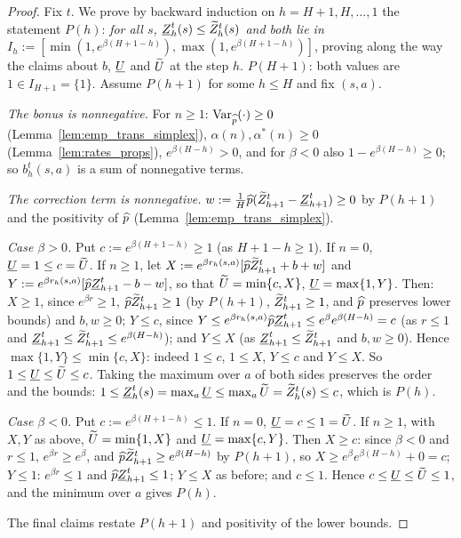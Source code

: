 \begin{proof}
\leanok
Fix $t$. We prove by backward induction on $h = H + 1, H, \dots, 1$ the statement $P(h)$:
\emph{for all $s$, $\underline{Z}^t_h(s) \le \widetilde{Z}^t_h(s)$ and both lie in $I_h := [\min(1, e^{\beta(H + 1 - h)}), \max(1, e^{\beta(H + 1 - h)})]$},
proving along the way the claims about $b$, $\underline{U}$ and $\widetilde{U}$ at the step $h$. $P(H + 1)$: both
values are $1 \in I_{H+1} = \{1\}$. Assume $P(h + 1)$ for some $h \le H$ and fix $(s, a)$.

\emph{The bonus is nonnegative.} For $n \ge 1$: $\operatorname{Var}_{\widehat{p}}(\cdot) \ge 0$ (Lemma~\ref{lem:emp_trans_simplex}),
$\alpha(n), \alpha^*(n) \ge 0$ (Lemma~\ref{lem:rates_props}), $e^{\beta(H - h)} > 0$, and for $\beta < 0$
also $1 - e^{\beta(H - h)} \ge 0$; so $b_h^t(s, a)$ is a sum of nonnegative terms.

\emph{The correction term is nonnegative.} $w := \frac1H \widehat{p}(\widetilde{Z}^t_{h+1} - \underline{Z}^t_{h+1}) \ge 0$ by
$P(h + 1)$ and the positivity of $\widehat{p}$ (Lemma~\ref{lem:emp_trans_simplex}).

\emph{Case $\beta > 0$.} Put $c := e^{\beta(H + 1 - h)} \ge 1$ (as $H + 1 - h \ge 1$). If $n = 0$,
$\underline{U} = 1 \le c = \widetilde{U}$. If $n \ge 1$, let $X := e^{\beta r_h(s, a)}[\widehat{p}\widetilde{Z}^t_{h+1} + b + w]$ and
$Y := e^{\beta r_h(s, a)}[\widehat{p}\underline{Z}^t_{h+1} - b - w]$, so that $\widetilde{U} = \min\{c, X\}$, $\underline{U} = \max\{1, Y\}$.
Then: $X \ge 1$, since $e^{\beta r} \ge 1$, $\widehat{p} \widetilde{Z}^t_{h+1} \ge 1$ (by $P(h + 1)$, $\widetilde{Z}^t_{h+1} \ge 1$,
and $\widehat{p}$ preserves lower bounds) and $b, w \ge 0$; $Y \le c$, since
$Y \le e^{\beta r_h(s, a)} \widehat{p} \underline{Z}^t_{h+1} \le e^{\beta} e^{\beta(H - h)} = c$ (as $r \le 1$ and
$\underline{Z}^t_{h+1} \le \widetilde{Z}^t_{h+1} \le e^{\beta(H - h)}$); and $Y \le X$ (as $\underline{Z}^t_{h+1} \le \widetilde{Z}^t_{h+1}$ and
$b, w \ge 0$). Hence $\max\{1, Y\} \le \min\{c, X\}$: indeed $1 \le c$, $1 \le X$, $Y \le c$ and
$Y \le X$. So $1 \le \underline{U} \le \widetilde{U} \le c$. Taking the maximum over $a$ of both sides preserves
the order and the bounds: $1 \le \underline{Z}^t_h(s) = \max_a \underline{U} \le \max_a \widetilde{U} = \widetilde{Z}^t_h(s) \le c$, which is $P(h)$.

\emph{Case $\beta < 0$.} Put $c := e^{\beta(H + 1 - h)} \le 1$. If $n = 0$, $\underline{U} = c \le 1 = \widetilde{U}$. If
$n \ge 1$, with $X, Y$ as above, $\widetilde{U} = \min\{1, X\}$ and $\underline{U} = \max\{c, Y\}$. Then $X \ge c$: since
$\beta < 0$ and $r \le 1$, $e^{\beta r} \ge e^{\beta}$, and $\widehat{p}\widetilde{Z}^t_{h+1} \ge e^{\beta(H - h)}$ by
$P(h + 1)$, so $X \ge e^{\beta} e^{\beta(H - h)} + 0 = c$; $Y \le 1$: $e^{\beta r} \le 1$ and
$\widehat{p}\underline{Z}^t_{h+1} \le 1$; $Y \le X$ as before; and $c \le 1$. Hence $c \le \underline{U} \le \widetilde{U} \le 1$, and the
minimum over $a$ gives $P(h)$.

The final claims restate $P(h + 1)$ and positivity of the lower bounds.
\end{proof}

